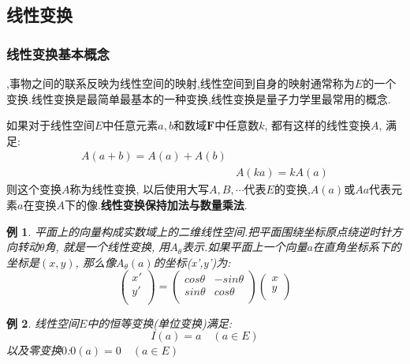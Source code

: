 \documentclass[a4paper,11pt]{article}
\theoremstyle{mystyle}
\newtheorem{example}{\hspace{2em}例}[section]
\begin{document}
\subsection{线性变换}
\subsubsection*{线性变换基本概念}
,事物之间的联系反映为线性空间的映射,线性空间到自身的映射通常称为$E$的一个变换.线性变换是最简单最基本的一种变换,线性变换是量子力学里最常用的概念.
\begin{definition}
  如果对于线性空间$E$中任意元素$a,b$和数域$\mathbf{F}$中任意数$k$, 都有这样的线性变换$A$, 满足:
  \begin{equation*}
  \begin{split}
     A(a+b)=A(a)+A(b)\\
     &A(ka)=kA(a)
  \end{split}
  \end{equation*}
  则这个变换$A$称为线性变换, 以后使用大写$A,B,\cdots$代表$E$的变换,$A(a)$或$Aa$代表元素$a$在变换$A$下的像.\textbf{线性变换保持加法与数量乘法}.
\end{definition}
\begin{example}
  平面上的向量构成实数域上的二维线性空间.把平面围绕坐标原点绕逆时针方向转动$\theta$角, 就是一个线性变换, 用$A_\theta$表示.如果平面上一个向量$a$在直角坐标系下的坐标是$(x,y)$, 那么像$A_\theta(a)$的坐标(x',y')为:
  \begin{equation*}
    \begin{pmatrix}
      x' \\
      y' \\
    \end{pmatrix}=\begin{pmatrix}
                    cos\theta & -sin\theta \\
                    sin\theta & cos\theta \\
                  \end{pmatrix}\begin{pmatrix}
                                 x \\
                                 y \\
                               \end{pmatrix}
  \end{equation*}
\end{example}
\begin{example}
  线性空间$E$中的恒等变换(单位变换)满足:
  \begin{equation*}
    I(a)=a\quad(a\in E)
  \end{equation*}
  以及零变换$0$:$0(a)=0\quad (a\in E)$
\end{example}
\end{document}
